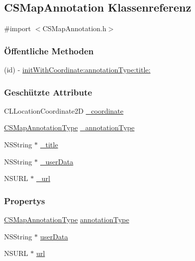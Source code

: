 \hypertarget{interface_c_s_map_annotation}{
\subsection{CSMapAnnotation Klassenreferenz}
\label{interface_c_s_map_annotation}
}


{\ttfamily \#import $<$CSMapAnnotation.h$>$}\subsubsection*{Öffentliche Methoden}
\begin{DoxyCompactItemize}
\item 
(id) -\/ \hyperlink{interface_c_s_map_annotation_a59239c83c34dd66add7bbc27492d636c}{initWithCoordinate:annotationType:title:}
\end{DoxyCompactItemize}
\subsubsection*{Geschützte Attribute}
\begin{DoxyCompactItemize}
\item 
CLLocationCoordinate2D \hyperlink{interface_c_s_map_annotation_a582707c028b9f92b952475fc0d6b6fee}{\_\-coordinate}
\item 
\hyperlink{_c_s_map_annotation_8h_a5a0fe47e1e7efa6aae66effae002d410}{CSMapAnnotationType} \hyperlink{interface_c_s_map_annotation_a6c62bc91ec129a0eccdd33b67132a6ba}{\_\-annotationType}
\item 
NSString $\ast$ \hyperlink{interface_c_s_map_annotation_ab46f2fe2f09d5a915a7822be0afe075a}{\_\-title}
\item 
NSString $\ast$ \hyperlink{interface_c_s_map_annotation_a59d92c9b7f147399b428a5ef97eef757}{\_\-userData}
\item 
NSURL $\ast$ \hyperlink{interface_c_s_map_annotation_aa08c22c0cfbd8cf2c4f05cbfc992d006}{\_\-url}
\end{DoxyCompactItemize}
\subsubsection*{Propertys}
\begin{DoxyCompactItemize}
\item 
\hyperlink{_c_s_map_annotation_8h_a5a0fe47e1e7efa6aae66effae002d410}{CSMapAnnotationType} \hyperlink{interface_c_s_map_annotation_a073d4596a4598c6e8b4b6c1acb24cc4d}{annotationType}
\item 
NSString $\ast$ \hyperlink{interface_c_s_map_annotation_a8afd11417c3990f0db0c9437da102419}{userData}
\item 
NSURL $\ast$ \hyperlink{interface_c_s_map_annotation_a181ec27d42b87d0115b9f3df411fdbb7}{url}
\end{DoxyCompactItemize}



